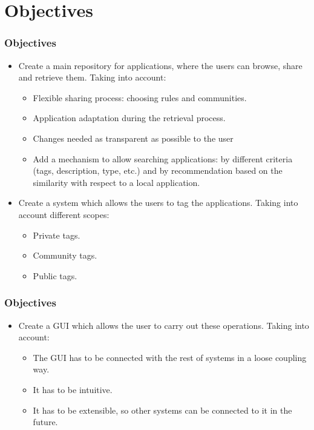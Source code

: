 \section{Objectives}

\begin{frame}
\frametitle{Objectives} 

	\begin{itemize}
	  \item Create a main repository for applications, where the users can browse,
	  share and retrieve them. Taking into account:
	  \begin{itemize}
	    \item Flexible sharing process: choosing rules and communities.
	    \item Application adaptation during the retrieval process.
	    \item Changes needed as transparent as possible to the user
	    \item Add a mechanism to allow searching applications: by different criteria
	    (tags, description, type, etc.) and by recommendation based on the
	    similarity with respect to a local application.
	  \end{itemize}
	  
	  \item Create a system which allows the users to tag the applications. Taking
	  into account different scopes:
	  \begin{itemize}
	    \item Private tags.
	    \item Community tags.
	    \item Public tags.
	  \end{itemize}
	  
	\end{itemize}

  
\end{frame}

\begin{frame}
\frametitle{Objectives} 
	\begin{itemize}
	  \item Create a GUI which allows the user to carry out these operations.
	  Taking into account:
	  \begin{itemize}
	    \item The GUI has to be connected with the rest of systems in a loose
	    coupling way.
	    \item It has to be intuitive.
	    \item It has to be extensible, so other systems can be connected to it in
	    the future.
	  \end{itemize}
	\end{itemize}

\end{frame}
